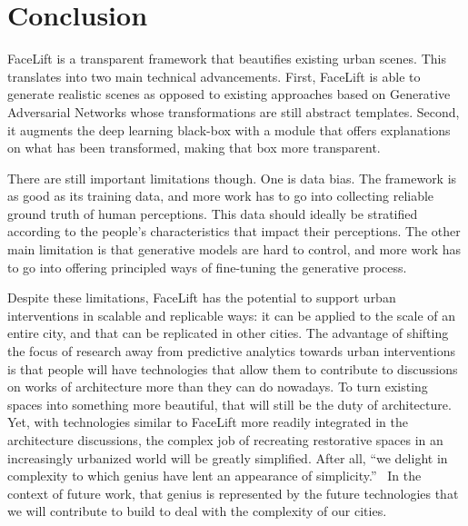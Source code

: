 \section{Conclusion}
\label{sec:discussion}

FaceLift is a transparent framework that beautifies existing urban scenes. This translates into two main technical advancements. First, FaceLift is able to generate realistic scenes as opposed to existing approaches based on  Generative Adversarial Networks whose transformations are still abstract templates.  Second, it augments the deep learning black-box with a module that offers explanations on what has been transformed, making that box more transparent. 

There are still important limitations though. One is data bias. The framework is as good as its training data, and more work has to go into collecting reliable ground truth of human perceptions. This data should ideally be stratified according to the people's characteristics that  impact their perceptions. The other main limitation is that generative models are hard to control, and more work has to go into offering principled ways of fine-tuning the generative process.

Despite these limitations, FaceLift has the potential to support urban interventions  in scalable  and replicable ways: it can be applied to the scale of an entire city, and that  can be replicated in other cities. The advantage of shifting the focus of research away from predictive analytics towards urban interventions is that people will have technologies that allow them to contribute to discussions on works of architecture  more than they can do nowadays. To turn existing spaces into something more beautiful, that will still be the duty of architecture. Yet, with technologies similar to FaceLift more readily integrated in the architecture discussions, the complex job of recreating restorative spaces in an increasingly urbanized world will be greatly simplified.  After all, ``we delight in complexity to which genius have lent an appearance of simplicity.''~\cite{de2008architecture} In the context of future work, that genius is represented by the future technologies that we will contribute to build to deal with the complexity of our cities.



